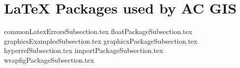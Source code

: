 
\section[\LaTeX{} Packages]{\LaTeX{} Packages used by AC GIS}
{commonLatexErrorsSubsection.tex}
{floatPackageSubsection.tex}
{graphicsExamplesSubsection.tex}
{graphicxPackageSubsection.tex}
{hyperrefSubsection.tex}
{importPackageSubsection.tex}
{wrapfigPackageSubsection.tex}

